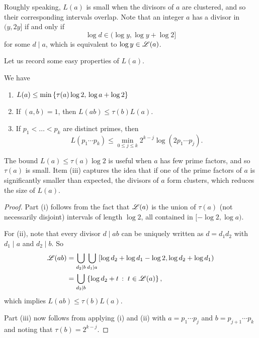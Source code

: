 Roughly speaking, $L(a)$ is small when the divisors of $a$ are clustered, and so their corresponding intervals overlap.
Note that an integer $a$ has a divisor in $(y, 2y]$ if and only if 
\begin{equation*}
    \log d \in (\log y, \log y + \log 2]
\end{equation*}
for some $d \mid a$, which is equivalent to $\log y \in \mathscr{L} (a)$.

Let us record some easy properties of $L(a)$.
\begin{lemma} \label{lem:properties-of-L}
    We have 
    \begin{enumerate}[label=(\roman*)]
        \item \label{item:properties-1} $L(a) \le \min \left\{\tau (a) \log 2,\, \log a + \log 2\right\}$
        \item \label{item:properties-2} If $(a, b) = 1$, then $L(ab) \le \tau(b) L(a)$.
        \item \label{item:properties-3} If $p_1 < \dots < p_k$ are distinct primes, then 
            \begin{equation*}
                L(p_1 \cdots p_k) \le \min \limits_{0 \le j \le k} 2^{k - j} \log(2p_1 \cdots p_j).
            \end{equation*}
    \end{enumerate}
\end{lemma}

The bound $L(a) \le \tau(a) \log 2$ is useful when $a$ has few prime factors, and so $\tau(a)$ is small.
Item (iii) captures the idea that if one of the prime factors of $a$ is significantly smaller than expected, the divisors of $a$ form clusters, which reduces the size of $L(a)$.

\begin{proof}
    Part (i) follows from the fact that $\mathscr{L}(a)$ is the union of $\tau(a)$ (not necessarily disjoint) intervals of length $\log 2$, all contained in $[-\log 2, \log a)$.

    For (ii), note that every divisor $d\mid ab$ can be uniquely written as $d = d_1 d_2$ with $d_1 \mid a$ and $d_2 \mid b$. 
    So
    \begin{align*}
        \mathscr{L} (ab) &= \bigcup \limits_{d_2 \mid b} \bigcup \limits_{d_1 \mid a} \left[ \log d_2 + \log d_1 - \log 2, \log d_2 + \log d_1 \right)  \\
            &= \bigcup \limits_{d_2 \mid b} \left\{ \log d_2 + t\,:\;t \in \mathscr{L} (a)\right\},
    \end{align*}
    which implies $L(ab) \le \tau (b) L(a)$.

    Part (iii) now follows from applying (i) and (ii) with $a = p_1 \cdots p_j$ and $b = p_{j + 1} \cdots p_k$ and noting that $\tau(b) = 2^{k - j}$.
\end{proof}

